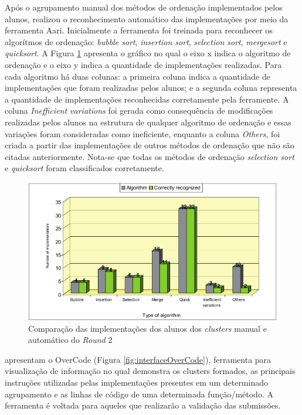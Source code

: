     Após o agrupamento manual dos métodos de ordenação implementados pelos alunos,
     realizou o reconhecimento automático das
    implementações por meio da ferramenta Aari. Inicialmente a ferramenta foi
    treinada para reconhecer os algorítmos de ordenação: \textit{bubble sort},
    \textit{insertion sort}, \textit{selection sort}, \textit{mergesort} e
    \textit{quicksort}. A Figura \ref{fig:clusterAutomatico} apresenta o gráfico
    no qual o eixo x indica o algoritmo de ordenação e o eixo y indica a
    quantidade de implementações realizadas. Para cada algoritmo há duas colunas:
    a primeira coluna indica a quantidade de implementações que foram realizadas
    pelos alunos; e a segunda coluna representa a quantidade de implementações
    reconhecidas corretamente pela ferramente. A coluna \textit{Inefficient variations}
    foi gerada como consequência de modificações realizadas pelos alunos na
    estrutura de qualquer algoritmo de ordenação e essas variações foram
    consideradas como ineficiente, enquanto a coluna \textit{Others}, foi
    criada a partir das implementações de outros métodos de ordenação que
    não são citadas anteriormente. Nota-se que todas os métodos de ordenação
    \textit{selection sort} e \textit{quicksort} foram classificados corretamente.
    
    \begin{figure}[ht]
        \centering
        \includegraphics[scale=0.33]{imagem/clusterAutomatico.png}
        \caption{Comparação das implementações dos alunos dos \textit{clusters}
        	manual e automático do \textit{Round} 2}
        \label{fig:clusterAutomatico}
    \end{figure}
    
     apresentam o OverCode (Figura \ref{fig:interfaceOverCode}),
    ferramenta para visualização de informação no qual demonstra os clusters formados,
    as principais instruções utilizadas pelas implementações presentes em um
    determinado agrupamento e as linhas de código de uma determinada função/método.
    A ferramenta é voltada para aqueles que realizarão a validação das submissões.
    
